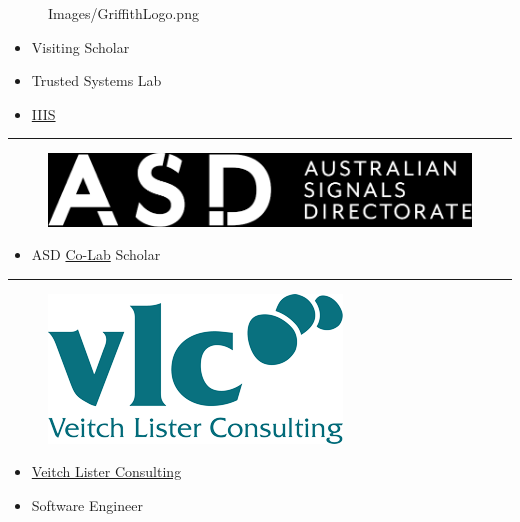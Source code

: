 \documentclass
  [hyperref={colorlinks = true,linkcolor = blue, 
             citecolor = blue, urlcolor = blue}
  ]{beamer}
\begin{document}
\begin{frame}[fragile]
\begin{minipage}{0.5\linewidth}
\begin{figure}[h]
        {Images/GriffithLogo.png}
    \end{figure}
  \end{minipage}
  \hfill
  \begin{minipage}{0.45\linewidth}
  \begin{itemize}
    \item Visiting Scholar
    \item Trusted Systems Lab
    \item \href{https://www.griffith.edu.au/institute-integrated-intelligent-systems}{IIIS}
  \end{itemize}
  \end{minipage}
\hrule
  \begin{minipage}{0.5\linewidth}
    \begin{figure}[h]
      \includegraphics[width=\linewidth]
        {Images/asd-logo.png}
    \end{figure}
  \end{minipage}
  \hfill
  \begin{minipage}{0.45\linewidth}
  \begin{itemize}
    \item ASD 
      \href{https://www.asd.gov.au/about/asd-anu-co-lab}{Co-Lab} 
      Scholar
  \end{itemize}
  \end{minipage}
\hrule
  \begin{minipage}{0.5\linewidth}
    \begin{figure}[h]
      \includegraphics[width=\linewidth]
        {Images/VLClogo.png}
    \end{figure}
  \end{minipage}
  \hfill
  \begin{minipage}{0.45\linewidth}
  \begin{itemize}
    \item \href{https://veitchlister.com/}{Veitch Lister
    Consulting} 
    \item Software Engineer
  \end{itemize}
  \end{minipage}
\end{frame}
\end{document}

